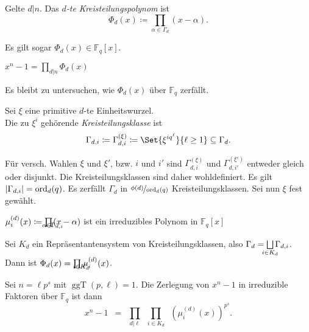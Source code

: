 \documentclass{cheat-sheet}
\newcommand{\F}{\mathbb{F}} %
\newcommand{\divides}{|} %
\DeclareMathOperator{\ggT}{ggT} %
\DeclareMathOperator{\ord}{ord} %
\begin{document}
\begin{defn}
  Gelte $d \divides n$.
  Das \emph{$d$-te Kreisteilungspolynom} ist
  \[
    \Phi_d(x) \coloneqq \prod_{\alpha \in \Gamma_d} (x - \alpha).
  \]
\end{defn}

\begin{lem}
  Es gilt sogar $\Phi_d(x) \in \F_q[x]$.
\end{lem}

\begin{kor}
  $x^n - 1 = \prod_{d \divides n} \Phi_d(x)$
\end{kor}

\begin{bem}
  Es bleibt zu untersuchen, wie $\Phi_d(x)$ über $\F_q$ zerfällt.
\end{bem}

\begin{defn}
  Sei $\xi$ eine primitive $d$-te Einheitswurzel. \\
  Die zu $\xi^i$ gehörende \emph{Kreisteilungsklasse} ist
  \[
    \Gamma_{d,i} \coloneqq \Gamma^{(\xi)}_{d,i} \coloneqq \Set{\xi^{i q^\ell}}{\ell \geq 1} \subseteq \Gamma_d.
  \]
\end{defn}

\begin{bem}
  Für versch. Wahlen $\xi$ und $\xi'$, bzw. $i$ und $i'$ sind $\Gamma^{(\xi)}_{d,i}$ und $\Gamma^{(\xi')}_{d,i'}$ entweder gleich oder disjunkt.
  Die Kreisteilungsklassen sind daher wohldefiniert.
  Es gilt $\abs{\Gamma_{d,i}} = \ord_d(q)$.
  Es zerfällt $\Gamma_d$ in $\nicefrac{\phi(d)}{\ord_d(q)}$ Kreisteilungsklassen.
  Sei nun $\xi$ fest gewählt.
\end{bem}

\begin{lem}
  $\mu^{(d)}_i(x) \coloneqq \prod_{\mathclap{\alpha \in \Gamma_{d,i}}} (x - \alpha)$ ist ein irreduzibles Polynom in $\F_q [x]$
\end{lem}

\begin{kor}
  Sei $K_d$ ein Repräsentantensystem von Kreisteilungsklassen, also
  $\Gamma_d = \bigsqcup_{\mathclap{i \in K_d}} \Gamma_{d,i}$.
  Dann ist $\Phi_d(x) = \prod_{\mathclap{i \in K_d}} \mu^{(d)}_i(x)$.
\end{kor}

\begin{fazit}
  Sei $n = \ell p^s$ mit $\ggT(p, \ell) = 1$.
  Die Zerlegung von $x^n - 1$ in irreduzible Faktoren über $\F_q$ ist dann
  \[
    x^n - 1 \enspace = \enspace \prod_{d \divides \ell} \enspace \prod_{i \in K_d} \enspace \left( \mu^{(d)}_i(x) \right)^{p^s}.
  \]
\end{fazit}
\end{document}
